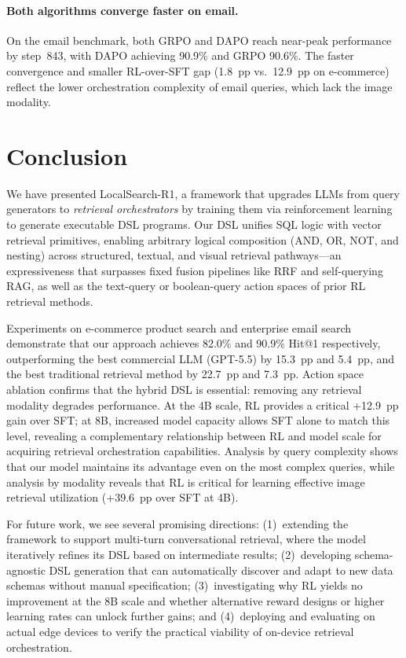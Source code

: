 \documentclass[11pt]{article}
\begin{document}
\paragraph{Both algorithms converge faster on email.}
On the email benchmark, both GRPO and DAPO reach near-peak performance by step~843, with DAPO achieving 90.9\% and GRPO 90.6\%. The faster convergence and smaller RL-over-SFT gap (1.8~pp vs.\ 12.9~pp on e-commerce) reflect the lower orchestration complexity of email queries, which lack the image modality.


\section{Conclusion}
\label{sec:conclusion}

We have presented LocalSearch-R1, a framework that upgrades LLMs from query generators to \emph{retrieval orchestrators} by training them via reinforcement learning to generate executable DSL programs. Our DSL unifies SQL logic with vector retrieval primitives, enabling arbitrary logical composition (AND, OR, NOT, and nesting) across structured, textual, and visual retrieval pathways---an expressiveness that surpasses fixed fusion pipelines like RRF and self-querying RAG, as well as the text-query or boolean-query action spaces of prior RL retrieval methods.

Experiments on e-commerce product search and enterprise email search demonstrate that our approach achieves 82.0\% and 90.9\% Hit@1 respectively, outperforming the best commercial LLM (GPT-5.5) by 15.3~pp and 5.4~pp, and the best traditional retrieval method by 22.7~pp and 7.3~pp. Action space ablation confirms that the hybrid DSL is essential: removing any retrieval modality degrades performance. At the 4B scale, RL provides a critical +12.9~pp gain over SFT; at 8B, increased model capacity allows SFT alone to match this level, revealing a complementary relationship between RL and model scale for acquiring retrieval orchestration capabilities. Analysis by query complexity shows that our model maintains its advantage even on the most complex queries, while analysis by modality reveals that RL is critical for learning effective image retrieval utilization (+39.6~pp over SFT at 4B).

For future work, we see several promising directions: (1)~extending the framework to support multi-turn conversational retrieval, where the model iteratively refines its DSL based on intermediate results; (2)~developing schema-agnostic DSL generation that can automatically discover and adapt to new data schemas without manual specification; (3)~investigating why RL yields no improvement at the 8B scale and whether alternative reward designs or higher learning rates can unlock further gains; and (4)~deploying and evaluating on actual edge devices to verify the practical viability of on-device retrieval orchestration.
\end{document}
